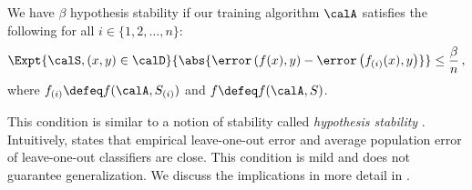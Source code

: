 

\begin{condition} 
    \label{cond:hypothesis_stability}
    We have $\beta$ hypothesis stability 
    if our training algorithm $\calA$ satisfies the following for all $i \in \{1,2,\ldots, n\}$: 
    \begin{align*}
    \Expt{\calS, (x,y) \in \calD}{ \abs{\error\left( f(x) ,y  \right) - \error\left( f_{(i)}(x), y \right) }} \le \frac{\beta}{n} \,,
    \end{align*}
    where $f_{(i)} \defeq f(\calA, S_{(i)})$ and $ f \defeq f(\calA, S)$.
\end{condition}

This condition is similar to a notion of stability 
called \emph{hypothesis stability} 
\citep{bousquet2002stability,kearns1999algorithmic,elisseeff2003leave}. 
Intuitively,  states 
that 
empirical leave-one-out error 
and average population error of leave-one-out classifiers
are close.
% 
This condition is mild 
and does not guarantee generalization. 
We discuss the implications in more detail in .

